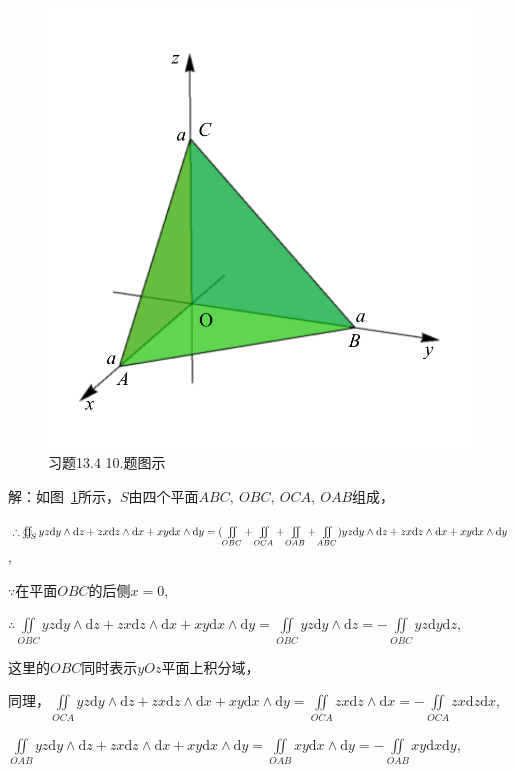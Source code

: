 \documentclass[12pt,UTF8,fleqn]{ctexart}
\newcommand{\md}[1]{\mathrm d#1}
\newcommand{\BSIInt}[2]{\iint\limits_{#1}#2}
\newcommand{\BSOIInt}[2]{\oiint\nolimits_{#1}#2}
\begin{document}
\begin{enumerate}
\begin{figure}[H]
\begin{center}
\includegraphics[height=0.7\textheight]{Figures23/Fig13-4-10.pdf}
\end{center}
\caption{习题13.4 10.题图示}
\label{13-4-10}
\end{figure}

解：如图~\ref{13-4-10}所示，$S$由四个平面$ABC,\ OBC,\ OCA,\ OAB$组成，

$\therefore\BSOIInt S{yz\md y\wedge\md z+zx\md z\wedge\md x+xy\md x\wedge\md y}\\
=(\BSIInt{OBC}+\BSIInt{OCA}+\BSIInt{OAB}+\BSIInt{ABC})yz\md y\wedge\md z+zx\md z\wedge\md x+xy\md x\wedge\md y$,

$\because$在平面$OBC$的后侧$x=0$,

$\therefore\BSIInt{OBC}yz\md y\wedge\md z+zx\md z\wedge\md x+xy\md x\wedge\md y=\BSIInt{OBC}yz\md y\wedge\md z=-\BSIInt{OBC}yz\md y\md z$,

这里的$OBC$同时表示$yOz$平面上积分域，

同理，$\BSIInt{OCA}yz\md y\wedge\md z+zx\md z\wedge\md x+xy\md x\wedge\md y=\BSIInt{OCA}zx\md z\wedge\md x=-\BSIInt{OCA}zx\md z\md x$,

$\BSIInt{OAB}yz\md y\wedge\md z+zx\md z\wedge\md x+xy\md x\wedge\md y=\BSIInt{OAB}xy\md x\wedge\md y=-\BSIInt{OAB}xy\md x\md y$,


\end{enumerate}
\end{document}
